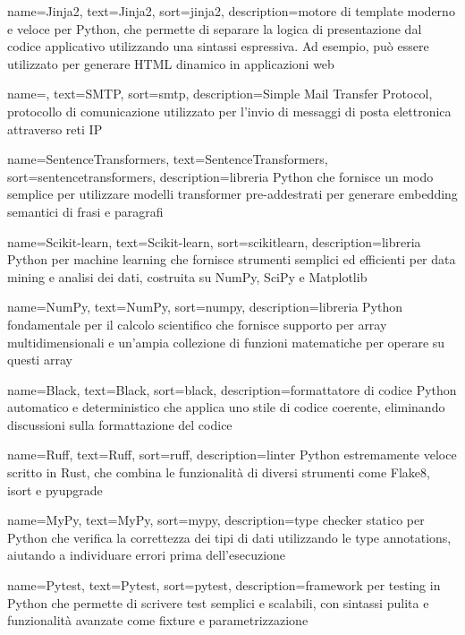  {
    name=Jinja2,
    text=Jinja2,
    sort=jinja2,
    description={motore di template moderno e veloce per Python, che permette di separare la logica di presentazione dal codice applicativo utilizzando una sintassi espressiva. Ad esempio, può essere utilizzato per generare HTML dinamico in applicazioni web}
}

 {
    name=,
    text=SMTP,
    sort=smtp,
    description={Simple Mail Transfer Protocol, protocollo di comunicazione utilizzato per l'invio di messaggi di posta elettronica attraverso reti IP}
}

 {
    name=SentenceTransformers,
    text=SentenceTransformers,
    sort=sentencetransformers,
    description={libreria Python che fornisce un modo semplice per utilizzare modelli transformer pre-addestrati per generare embedding semantici di frasi e paragrafi}
}

 {
    name=Scikit-learn,
    text=Scikit-learn,
    sort=scikitlearn,
    description={libreria Python per machine learning che fornisce strumenti semplici ed efficienti per data mining e analisi dei dati, costruita su NumPy, SciPy e Matplotlib}
}

 {
    name=NumPy,
    text=NumPy,
    sort=numpy,
    description={libreria Python fondamentale per il calcolo scientifico che fornisce supporto per array multidimensionali e un'ampia collezione di funzioni matematiche per operare su questi array}
}

 {
    name=Black,
    text=Black,
    sort=black,
    description={formattatore di codice Python automatico e deterministico che applica uno stile di codice coerente, eliminando discussioni sulla formattazione del codice}
}

 {
    name=Ruff,
    text=Ruff,
    sort=ruff,
    description={linter Python estremamente veloce scritto in Rust, che combina le funzionalità di diversi strumenti come Flake8, isort e pyupgrade}
}

 {
    name=MyPy,
    text=MyPy,
    sort=mypy,
    description={type checker statico per Python che verifica la correttezza dei tipi di dati utilizzando le type annotations, aiutando a individuare errori prima dell'esecuzione}
}

 {
    name=Pytest,
    text=Pytest,
    sort=pytest,
    description={framework per testing in Python che permette di scrivere test semplici e scalabili, con sintassi pulita e funzionalità avanzate come fixture e parametrizzazione}
}

